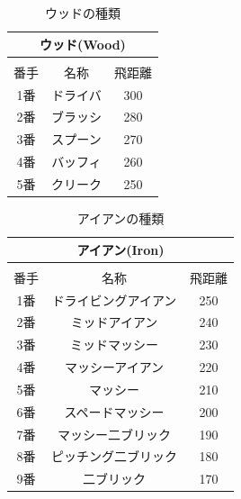 \documentclass[a4j, twocolumn]{jarticle}
\begin{document}
\begin{table}[htb]
    \caption{ウッドの種類}
    \label{Wood_Table}
    \vspace{-7.0mm}
    \begin{center}
        \begin{tabular}{|c|c|c|}
            \hline
            \multicolumn{3}{|c|}{ウッド(Wood)}\\ %
            \hline
            \multicolumn{3}{c}{}\\ [-3.0ex]
            \hline
            番手&名称&飛距離\\
            \hline
            1番&ドライバ&300\\ 
            \hline
            2番&ブラッシ&280\\
            \hline
            3番&スプーン&270\\
            \hline
            4番&バッフィ&260\\
            \hline
            5番&クリーク&250\\
            \hline
        \end{tabular}
    \end{center}
\end{table}
\vspace{-20pt}
\begin{table}[htb]
    \caption{アイアンの種類}
    \label{Iron_Table}
    \vspace{-7.0mm}
    \begin{center}
        \begin{tabular}{|c|c|c|}
            \hline
            \multicolumn{3}{|c|}{アイアン(Iron)}\\
            \hline
            \multicolumn{3}{c}{}\\ [-3.0ex]
            \hline
            番手&名称&飛距離\\ 
            \hline
            1番&ドライビングアイアン&250\\
            \hline
            2番&ミッドアイアン&240\\
            \hline
            3番&ミッドマッシー&230\\ 
            \hline
            4番&マッシーアイアン&220\\
            \hline
            5番&マッシー&210\\
            \hline
            6番&スペードマッシー&200\\
            \hline
            7番&マッシー二ブリック&190\\
            \hline
            8番&ピッチング二ブリック&180\\
            \hline
            9番&二ブリック&170\\
            \hline
        \end{tabular}
    \end{center}
\end{table}
\end{document}
